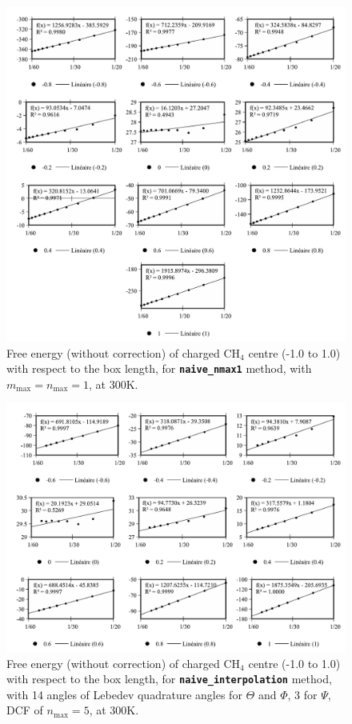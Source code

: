 \begin{figure}[h]
\begin{centering}
\includegraphics[width=0.95\columnwidth]{_figure/results/ch4_nmax1_lmn}
\par\end{centering}
\caption{Free energy (without correction) of charged $\mathrm{C}\mathrm{H}_{4}$
centre (-1.0 to 1.0) with respect to the box length, for \texttt{\textbf{naive\_nmax1}}
method, with $m_{\max}=n_{\max}=1$, at 300K.\label{fig:ch4_nmax1_lmn}}
\end{figure}

\begin{figure}[!th]
\begin{centering}
\includegraphics[width=0.95\columnwidth]{_figure/results/ch4_nmax5_inter}
\par\end{centering}
\caption{Free energy (without correction) of charged $\mathrm{C}\mathrm{H}_{4}$
centre (-1.0 to 1.0) with respect to the box length, for \texttt{\textbf{naive\_interpolation}}
method, with 14 angles of Lebedev quadrature angles for $\Theta$
and $\Phi$, 3 for $\Psi$, DCF of $n_{\max}=5$, at 300K.\label{fig:ch4_nmax5_inter}}
\end{figure}

